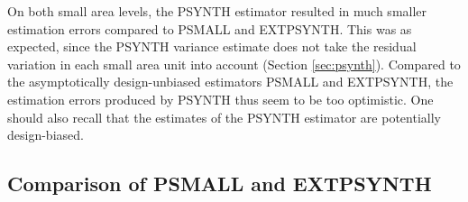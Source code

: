 \documentclass[remotesensing,article,submit,moreauthors,pdftex,10pt,a4paper]{mdpi}
\newcommand{\psynth}{PSYNTH}
\newcommand{\psmall}{PSMALL}
\newcommand{\extpsynth}{EXTPSYNTH}
\begin{document}
On both small area levels, the \psynth{} estimator resulted in much smaller estimation errors compared to \psmall{} and \extpsynth{}. This was as expected, since the \psynth{} variance estimate does not take the residual variation in each small area unit into account (Section \ref{sec:psynth}). Compared to the asymptotically design-unbiased estimators \psmall{} and \extpsynth{}, the estimation errors produced by \psynth{} thus seem to be too optimistic. One should also recall that the estimates of the \psynth{} estimator are potentially design-biased.


\subsection{Comparison of \psmall{} and \extpsynth{}}
\label{sec:comp}
\end{document}

